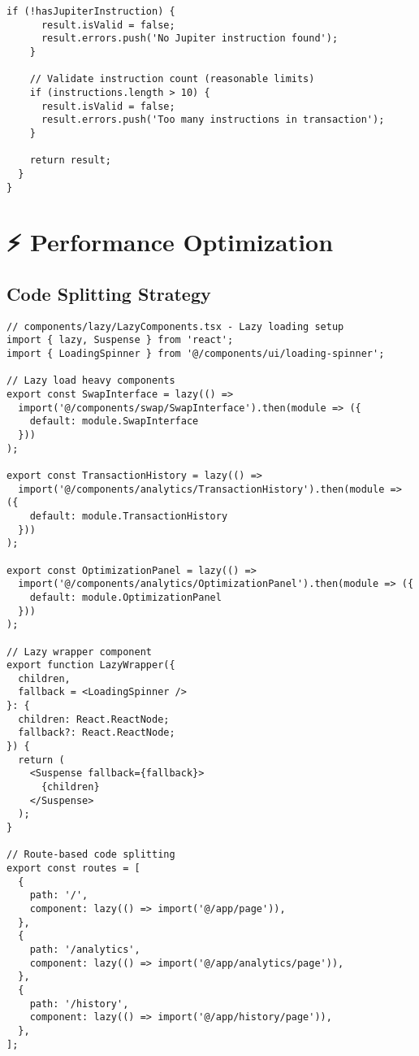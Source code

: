 \documentclass[11pt,a4paper]{article}
\begin{document}
\begin{lstlisting}[style=typescript, caption=Secure Transaction Handling]
    if (!hasJupiterInstruction) {
      result.isValid = false;
      result.errors.push('No Jupiter instruction found');
    }
    
    // Validate instruction count (reasonable limits)
    if (instructions.length > 10) {
      result.isValid = false;
      result.errors.push('Too many instructions in transaction');
    }
    
    return result;
  }
}
\end{lstlisting}

\section{⚡ Performance Optimization}

\subsection{Code Splitting Strategy}

\begin{lstlisting}[style=typescript, caption=Advanced Code Splitting Implementation]
// components/lazy/LazyComponents.tsx - Lazy loading setup
import { lazy, Suspense } from 'react';
import { LoadingSpinner } from '@/components/ui/loading-spinner';

// Lazy load heavy components
export const SwapInterface = lazy(() => 
  import('@/components/swap/SwapInterface').then(module => ({
    default: module.SwapInterface
  }))
);

export const TransactionHistory = lazy(() =>
  import('@/components/analytics/TransactionHistory').then(module => ({
    default: module.TransactionHistory
  }))
);

export const OptimizationPanel = lazy(() =>
  import('@/components/analytics/OptimizationPanel').then(module => ({
    default: module.OptimizationPanel
  }))
);

// Lazy wrapper component
export function LazyWrapper({ 
  children, 
  fallback = <LoadingSpinner /> 
}: { 
  children: React.ReactNode;
  fallback?: React.ReactNode;
}) {
  return (
    <Suspense fallback={fallback}>
      {children}
    </Suspense>
  );
}

// Route-based code splitting
export const routes = [
  {
    path: '/',
    component: lazy(() => import('@/app/page')),
  },
  {
    path: '/analytics',
    component: lazy(() => import('@/app/analytics/page')),
  },
  {
    path: '/history',
    component: lazy(() => import('@/app/history/page')),
  },
];
\end{lstlisting}
\end{document}
